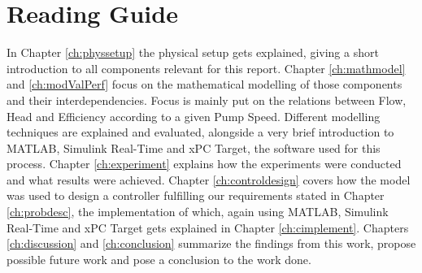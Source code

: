 \section*{Reading Guide}

In Chapter \ref{ch:physsetup} the physical setup gets explained,
giving a short introduction to all components relevant for this report.
Chapter \ref{ch:mathmodel} and \ref{ch:modValPerf}
focus on the mathematical modelling of those components and their interdependencies.
Focus is mainly put on the relations between Flow, Head and Efficiency according to a given Pump Speed.
Different modelling techniques are explained and evaluated,
alongside a very brief introduction to MATLAB\textsuperscript{\textregistered{}},
Simulink\textsuperscript{\textregistered{}} Real-Time\texttrademark{} and xPC Target,
the software used for this process.
Chapter \ref{ch:experiment} explains how the experiments were conducted
and what results were achieved.
Chapter \ref{ch:controldesign} covers how the model was used to design a controller
fulfilling our requirements stated in Chapter \ref{ch:probdesc},
the implementation of which,
again using
MATLAB\textsuperscript{\textregistered{}},
Simulink\textsuperscript{\textregistered{}} Real-Time\texttrademark{}
and xPC Target gets explained in Chapter \ref{ch:cimplement}.
Chapters \ref{ch:discussion} and \ref{ch:conclusion} summarize the findings from this work,
propose possible future work and pose a conclusion to the work done.
